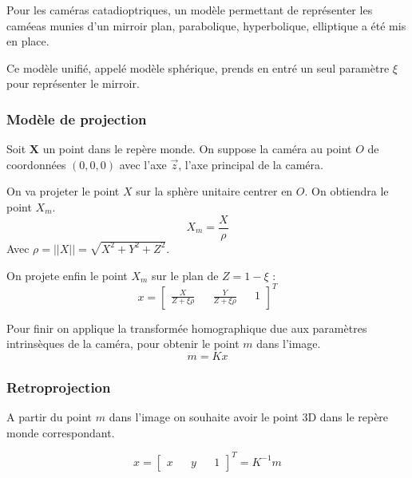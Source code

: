 Pour les caméras catadioptriques, un modèle permettant de représenter les caméeas munies d'un mirroir plan, parabolique, hyperbolique, elliptique a été mis en place.

Ce modèle unifié, appelé modèle sphérique, prends en entré un seul paramètre $\xi$ pour représenter le mirroir.


\subsubsection{Modèle de projection}

Soit $\mathbf{X}$ un point dans le repère monde.
On suppose la caméra au point $O$ de coordonnées $(0,0,0)$ avec l'axe $\vec{z}$, l'axe principal de la caméra.

On va projeter le point $X$ sur la sphère unitaire centrer en $O$. On obtiendra le point $X_m$.
\begin{equation}
X_m = \frac{X}{\rho}
\end{equation}
Avec $\rho = ||X|| = \sqrt{X^2+Y^2+Z^2}$.

On projete enfin le point $X_m$ sur le plan de $Z = 1 - \xi$ :
\begin{equation}
x = \begin{bmatrix}  \frac{X}{Z+\xi \rho} && \frac{Y}{Z +\xi \rho} && 1 \end{bmatrix}^{T}
\end{equation}

Pour finir on applique la transformée homographique due aux paramètres intrinsèques de la caméra, pour obtenir le point $m$ dans l'image.
\begin{equation}
m= K x
\end{equation}

\subsubsection{Retroprojection}

A partir du point $m$ dans l'image on souhaite avoir le point 3D dans le repère monde correspondant.

\begin{equation}
x = \begin{bmatrix} x && y && 1 \end{bmatrix}^{T} = K^{-1} m
\end{equation}


